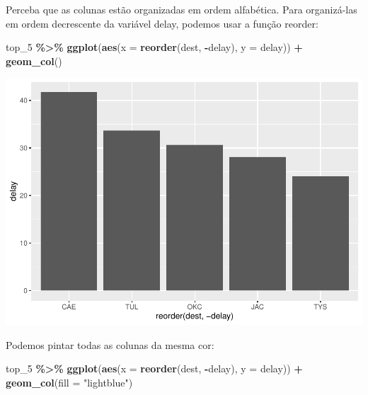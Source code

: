 \documentclass[
]{book}
\newenvironment{Shaded}{\begin{snugshade}}{\end{snugshade}}
\newcommand{\AttributeTok}[1]{\textcolor[rgb]{0.13,0.29,0.53}{#1}}
\newcommand{\FunctionTok}[1]{\textcolor[rgb]{0.13,0.29,0.53}{\textbf{#1}}}
\newcommand{\NormalTok}[1]{#1}
\newcommand{\SpecialCharTok}[1]{\textcolor[rgb]{0.81,0.36,0.00}{\textbf{#1}}}
\newcommand{\StringTok}[1]{\textcolor[rgb]{0.31,0.60,0.02}{#1}}
\begin{document}
Perceba que as colunas estão organizadas em ordem alfabética. Para organizá-las em ordem decrescente da variável delay, podemos usar a função reorder:

\begin{Shaded}
\begin{Highlighting}[]
\NormalTok{top\_5 }\SpecialCharTok{\%\textgreater{}\%} 
  \FunctionTok{ggplot}\NormalTok{(}\FunctionTok{aes}\NormalTok{(}\AttributeTok{x =} \FunctionTok{reorder}\NormalTok{(dest, }\SpecialCharTok{{-}}\NormalTok{delay), }\AttributeTok{y =}\NormalTok{ delay)) }\SpecialCharTok{+}
  \FunctionTok{geom\_col}\NormalTok{()}
\end{Highlighting}
\end{Shaded}

\includegraphics{AprendendoR_files/figure-latex/unnamed-chunk-66-1.pdf}

Podemos pintar todas as colunas da mesma cor:

\begin{Shaded}
\begin{Highlighting}[]
\NormalTok{top\_5 }\SpecialCharTok{\%\textgreater{}\%} 
  \FunctionTok{ggplot}\NormalTok{(}\FunctionTok{aes}\NormalTok{(}\AttributeTok{x =} \FunctionTok{reorder}\NormalTok{(dest, }\SpecialCharTok{{-}}\NormalTok{delay), }\AttributeTok{y =}\NormalTok{ delay)) }\SpecialCharTok{+}
  \FunctionTok{geom\_col}\NormalTok{(}\AttributeTok{fill =} \StringTok{"lightblue"}\NormalTok{)}
\end{Highlighting}
\end{Shaded}
\end{document}
